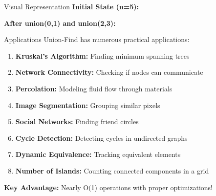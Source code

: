 \documentclass[aspectratio=169]{beamer}
\begin{document}
\begin{frame}{Visual Representation}
  \textbf{Initial State (n=5):}
  \begin{center}
  \end{center}

  \vspace{0.5cm}
  \textbf{After union(0,1) and union(2,3):}
  \begin{center}
  \end{center}
\end{frame}

\begin{frame}{Applications}
  Union-Find has numerous practical applications:

  \vspace{0.3cm}
  \begin{enumerate}
    \item \textbf{Kruskal's Algorithm:} Finding minimum spanning trees
    \item \textbf{Network Connectivity:} Checking if nodes can communicate
    \item \textbf{Percolation:} Modeling fluid flow through materials
    \item \textbf{Image Segmentation:} Grouping similar pixels
    \item \textbf{Social Networks:} Finding friend circles
    \item \textbf{Cycle Detection:} Detecting cycles in undirected graphs
    \item \textbf{Dynamic Equivalence:} Tracking equivalent elements
    \item \textbf{Number of Islands:} Counting connected components in a grid
  \end{enumerate}

  \vspace{0.3cm}
  \textbf{Key Advantage:} Nearly O(1) operations with proper optimizations!
\end{frame}
\end{document}
